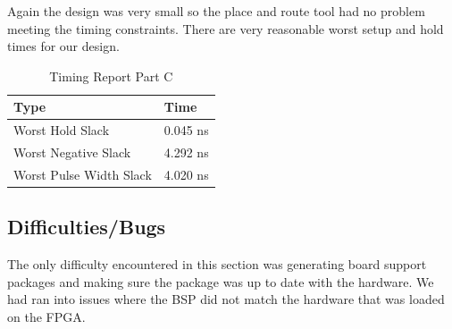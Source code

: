 \documentclass[letterpaper, 10 pt, conference]{IEEEconf}  %
\begin{document}
Again the design was very small so the place and route tool had no problem meeting the timing constraints. There are very reasonable worst setup and hold times for our design.

\begin{table}[H]
\centering
\caption{Timing Report Part C}
\label{table_example}
\begin{tabular}{|l|l|}
\hline
\rowcolor[HTML]{EFEFEF} 
Type                 & Time     \\ \hline
Worst Hold Slack     & 0.045 ns \\ \hline
Worst Negative Slack & 4.292 ns \\ \hline
Worst Pulse Width Slack & 4.020 ns \\ \hline
\end{tabular}
\end{table}

\subsection{Difficulties/Bugs}
The only difficulty encountered in this section was generating board support packages and making sure the package was up to date with the hardware. We had ran into issues where the BSP did not match the hardware that was loaded on the FPGA. 
\end{document}
